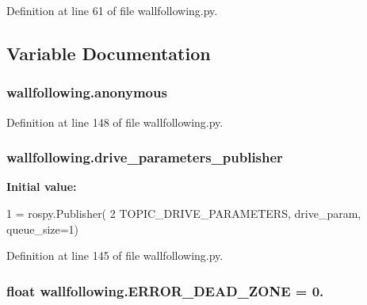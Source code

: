 Definition at line 61 of file wallfollowing.\+py.



\subsection{Variable Documentation}
\subsubsection[{\texorpdfstring{anonymous}{anonymous}}]{\setlength{\rightskip}{0pt plus 5cm}wallfollowing.\+anonymous}\hypertarget{namespacewallfollowing_a005968f85117845c036ef1cbd61034bb}{}\label{namespacewallfollowing_a005968f85117845c036ef1cbd61034bb}


Definition at line 148 of file wallfollowing.\+py.

\subsubsection[{\texorpdfstring{drive\+\_\+parameters\+\_\+publisher}{drive_parameters_publisher}}]{\setlength{\rightskip}{0pt plus 5cm}wallfollowing.\+drive\+\_\+parameters\+\_\+publisher}\hypertarget{namespacewallfollowing_aa69138defbbc5f21e99db50a6b3c903f}{}\label{namespacewallfollowing_aa69138defbbc5f21e99db50a6b3c903f}
{\bfseries Initial value\+:}
\begin{DoxyCode}
1 = rospy.Publisher(
2     TOPIC\_DRIVE\_PARAMETERS, drive\_param, queue\_size=1)
\end{DoxyCode}


Definition at line 145 of file wallfollowing.\+py.

\subsubsection[{\texorpdfstring{E\+R\+R\+O\+R\+\_\+\+D\+E\+A\+D\+\_\+\+Z\+O\+NE}{ERROR_DEAD_ZONE}}]{\setlength{\rightskip}{0pt plus 5cm}float wallfollowing.\+E\+R\+R\+O\+R\+\_\+\+D\+E\+A\+D\+\_\+\+Z\+O\+NE = 0.}\hypertarget{namespacewallfollowing_ac87d5f143cfd44f170a1d385ebd1a71b}{}\label{namespacewallfollowing_ac87d5f143cfd44f170a1d385ebd1a71b}



